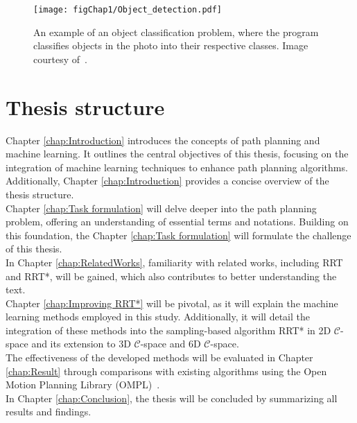 \documentclass{ctuthesis}
\begin{document}
\begin{figure}
  \centering
  \texttt{[image: figChap1/Object\_detection.pdf]}
  \caption{An example of an object classification problem, 
  where the program classifies objects in the photo into their respective classes.
  Image courtesy of~\cite{ObjectDetection}.}
  \label{fig:ObjectDetection}
\end{figure} 
 
\section{Thesis structure}

Chapter \ref{chap:Introduction} introduces the concepts of path planning and machine learning. 
It outlines the central objectives of this thesis, focusing on the integration of machine learning techniques to enhance path planning algorithms. 
Additionally, Chapter \ref{chap:Introduction} provides a concise overview of the thesis structure.\\[12pt]
Chapter \ref{chap:Task formulation} will delve deeper into the path planning problem, 
offering an understanding of essential terms and notations. 
Building on this foundation, the Chapter \ref{chap:Task formulation} will formulate the challenge of this thesis.\\[12pt]
In Chapter \ref{chap:RelatedWorks}, familiarity with related works, including RRT and RRT*, 
will be gained, which also contributes to better understanding the text.\\[12pt]
Chapter \ref{chap:Improving RRT*} will be pivotal, 
as it will explain the machine learning methods employed in this study. 
Additionally, 
it will detail the integration of these methods into 
the sampling-based algorithm RRT* in 2D $\mathcal{C}$-space and its extension to 3D $\mathcal{C}$-space and 6D $\mathcal{C}$-space.\\[12pt]
The effectiveness of the developed methods will be evaluated in Chapter \ref{chap:Result} through comparisons with existing algorithms 
using the Open Motion Planning Library (OMPL)~\cite{Ioan2012ompl}.\\[12pt]
In Chapter \ref{chap:Conclusion}, the thesis will be concluded by summarizing all results and findings.
\end{document}
